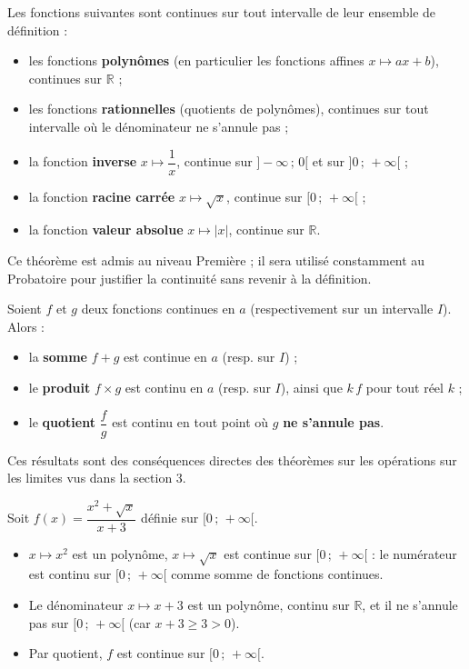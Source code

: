 \documentclass[11pt]{article}
\begin{document}
\begin{propriete}
Les fonctions suivantes sont continues sur tout intervalle de leur ensemble de définition :
\begin{itemize}
\item les fonctions \textbf{polynômes} (en particulier les fonctions affines $x \mapsto ax+b$), continues sur $\mathbb{R}$ ;
\item les fonctions \textbf{rationnelles} (quotients de polynômes), continues sur tout intervalle où le dénominateur ne s'annule pas ;
\item la fonction \textbf{inverse} $x \mapsto \dfrac{1}{x}$, continue sur $]-\infty\,;\,0[$ et sur $]0\,;\,+\infty[$ ;
\item la fonction \textbf{racine carrée} $x \mapsto \sqrt{x}$, continue sur $[0\,;\,+\infty[$ ;
\item la fonction \textbf{valeur absolue} $x \mapsto |x|$, continue sur $\mathbb{R}$.
\end{itemize}
Ce théorème est admis au niveau Première ; il sera utilisé constamment au Probatoire pour justifier la continuité sans revenir à la définition.
\end{propriete}

\begin{propriete}
Soient $f$ et $g$ deux fonctions continues en $a$ (respectivement sur un intervalle $I$). Alors :
\begin{itemize}
\item la \textbf{somme} $f + g$ est continue en $a$ (resp. sur $I$) ;
\item le \textbf{produit} $f \times g$ est continu en $a$ (resp. sur $I$), ainsi que $k\,f$ pour tout réel $k$ ;
\item le \textbf{quotient} $\dfrac{f}{g}$ est continu en tout point où $g$ \textbf{ne s'annule pas}.
\end{itemize}
Ces résultats sont des conséquences directes des théorèmes sur les opérations sur les limites vus dans la section 3.
\end{propriete}

\begin{exemplebox}
Soit $f(x) = \dfrac{x^2 + \sqrt{x}}{x + 3}$ définie sur $[0\,;\,+\infty[$.
\begin{itemize}
\item $x \mapsto x^2$ est un polynôme, $x \mapsto \sqrt{x}$ est continue sur $[0\,;\,+\infty[$ : le numérateur est continu sur $[0\,;\,+\infty[$ comme somme de fonctions continues.
\item Le dénominateur $x \mapsto x+3$ est un polynôme, continu sur $\mathbb{R}$, et il ne s'annule pas sur $[0\,;\,+\infty[$ (car $x+3 \geq 3 > 0$).
\item Par quotient, $f$ est continue sur $[0\,;\,+\infty[$.
\end{itemize}
\end{exemplebox}
\end{document}
